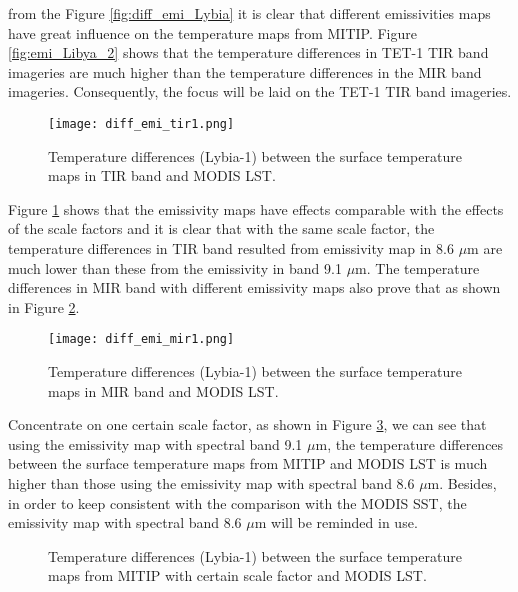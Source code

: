 \noindent from the Figure \ref{fig:diff_emi_Lybia} it is clear that different emissivities maps have great influence on the temperature maps from MITIP.  Figure \ref{fig:emi_Libya_2} shows that the temperature differences in TET-1 TIR band imageries are much higher than the temperature differences in the MIR band imageries. Consequently, the focus will be laid on the TET-1 TIR band imageries.\\

\begin{figure}[!htbp]
\centering
\texttt{[image: diff\_emi\_tir1.png]}
\caption{Temperature differences (Lybia-1) between the surface temperature maps in TIR band and MODIS LST.}
\label{fig:diff_emi_tir1}
\end{figure}

\noindent Figure \ref{fig:diff_emi_tir1} shows that the emissivity maps have effects comparable with the effects of the scale factors and it is clear that with the same scale factor, the temperature differences in TIR band resulted from emissivity map in 8.6 $\mu$m are much lower than these from the emissivity in band 9.1 $\mu$m. The temperature differences in MIR band with different emissivity maps also prove that as shown in Figure \ref{fig:diff_emi_mir1}.\\

\begin{figure}[!htbp]
\centering
\texttt{[image: diff\_emi\_mir1.png]}
\caption{Temperature differences (Lybia-1) between the surface temperature maps in MIR band and MODIS LST.}
\label{fig:diff_emi_mir1}
\end{figure}

\noindent Concentrate on one certain scale factor, as shown in Figure \ref{fig:diff_emi_Lybia2}, we can see that using the emissivity map with spectral band 9.1 $\mu$m, the temperature differences between the surface temperature maps from MITIP and MODIS LST is much higher than those using the emissivity map with spectral band 8.6 $\mu$m. Besides, in order to keep consistent with the comparison with the MODIS SST, the emissivity map with spectral band 8.6 $\mu$m will be reminded in use.\\

\begin{figure}[!htbp]
\centering
{}
\hspace{0.5in}
\caption{Temperature differences (Lybia-1) between the surface temperature maps from MITIP with certain scale factor and MODIS LST.}
\label{fig:diff_emi_Lybia2}
\end{figure}

